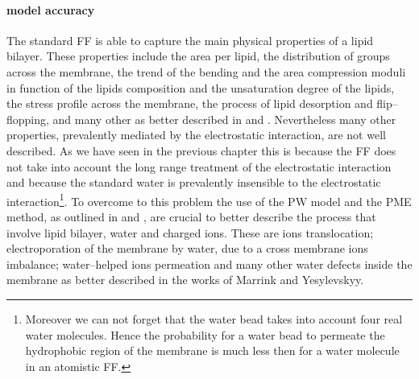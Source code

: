 \paragraph{\textbf{model accuracy}} The standard \martini \ac{FF} is able to capture the main physical properties 
of a lipid bilayer. These properties include the area per lipid, the distribution of groups across the membrane, 
the trend of the bending and the area compression moduli in function of the lipids composition and the 
unsaturation degree of the lipids, the stress profile across the membrane, the process of lipid desorption and 
flip--flopping, and many other as better described in \cite{Martini} and \cite{MartiniReview}. Nevertheless many 
other properties, prevalently mediated by the electrostatic interaction, are not well described. As we have seen 
in the previous chapter this is because the \martini \ac{FF} does not take into account the long range treatment 
of the electrostatic interaction and because the standard \martini water is prevalently insensible to the 
electrostatic interaction\footnote{Moreover we can not forget that the \martini water bead takes into account 
four real water molecules. Hence the probability for a \martini water bead to permeate the hydrophobic region of 
the membrane is much less then for a water molecule in an atomistic \ac{FF}.}. To overcome to this problem the 
use of the \ac{PW} model and the \ac{PME} method, as outlined in \cite{MartiniReview} and \cite{PW}, are crucial 
to better describe the process that involve lipid bilayer, water and charged ions. These are ions translocation; 
electroporation of the membrane by water, due to a cross membrane ions imbalance; water--helped ions permeation 
and many other water defects inside the membrane as better described in the works of Marrink and Yesylevskyy.

